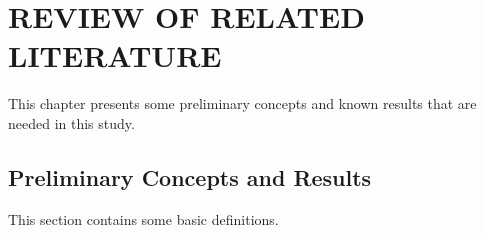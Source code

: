 \chapter{REVIEW OF RELATED LITERATURE}
{\baselineskip
 This chapter presents some preliminary concepts and known results that are needed in this study.

\section{Preliminary Concepts and Results}
This section contains some basic definitions.
}